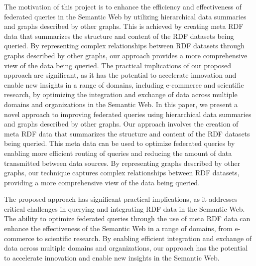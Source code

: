 The motivation of this project is to enhance the efficiency and effectiveness of federated queries in the Semantic Web by utilizing hierarchical data summaries and graphs described by other graphs. This is achieved by creating meta RDF data that summarizes the structure and content of the RDF datasets being queried. By representing complex relationships between RDF datasets through graphs described by other graphs, our approach provides a more comprehensive view of the data being queried. The practical implications of our proposed approach are significant, as it has the potential to accelerate innovation and enable new insights in a range of domains, including e-commerce and scientific research, by optimizing the integration and exchange of data across multiple domains and organizations in the Semantic Web.
In this paper, we present a novel approach to improving federated queries using hierarchical data summaries and graphs described by other graphs. Our approach involves the creation of meta RDF data that summarizes the structure and content of the RDF datasets being queried. This meta data can be used to optimize federated queries by enabling more efficient routing of queries and reducing the amount of data transmitted between data sources. By representing graphs described by other graphs, our technique captures complex relationships between RDF datasets, providing a more comprehensive view of the data being queried. 

The proposed approach has significant practical implications, as it addresses critical challenges in querying and integrating RDF data in the Semantic Web. The ability to optimize federated queries through the use of meta RDF data can enhance the effectiveness of the Semantic Web in a range of domains, from e-commerce to scientific research. By enabling efficient integration and exchange of data across multiple domains and organizations, our approach has the potential to accelerate innovation and enable new insights in the Semantic Web.